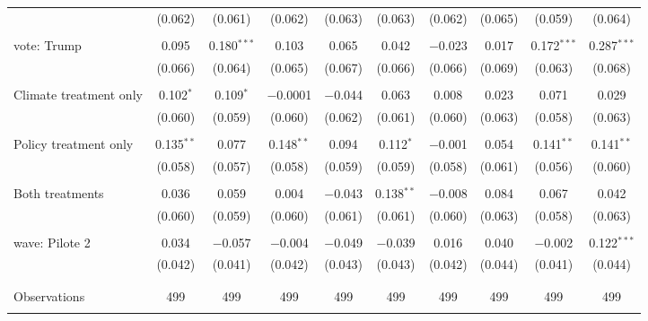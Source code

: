\begin{tabular}{@{\extracolsep{5pt}}lccccccccc}
  & (0.062) & (0.061) & (0.062) & (0.063) & (0.063) & (0.062) & (0.065) & (0.059) & (0.064) \\ 
  & & & & & & & & & \\ 
 vote: Trump & 0.095 & 0.180$^{***}$ & 0.103 & 0.065 & 0.042 & $-$0.023 & 0.017 & 0.172$^{***}$ & 0.287$^{***}$ \\ 
  & (0.066) & (0.064) & (0.065) & (0.067) & (0.066) & (0.066) & (0.069) & (0.063) & (0.068) \\ 
  & & & & & & & & & \\ 
 Climate treatment only & 0.102$^{*}$ & 0.109$^{*}$ & $-$0.0001 & $-$0.044 & 0.063 & 0.008 & 0.023 & 0.071 & 0.029 \\ 
  & (0.060) & (0.059) & (0.060) & (0.062) & (0.061) & (0.060) & (0.063) & (0.058) & (0.063) \\ 
  & & & & & & & & & \\ 
 Policy treatment only & 0.135$^{**}$ & 0.077 & 0.148$^{**}$ & 0.094 & 0.112$^{*}$ & $-$0.001 & 0.054 & 0.141$^{**}$ & 0.141$^{**}$ \\ 
  & (0.058) & (0.057) & (0.058) & (0.059) & (0.059) & (0.058) & (0.061) & (0.056) & (0.060) \\ 
  & & & & & & & & & \\ 
 Both treatments & 0.036 & 0.059 & 0.004 & $-$0.043 & 0.138$^{**}$ & $-$0.008 & 0.084 & 0.067 & 0.042 \\ 
  & (0.060) & (0.059) & (0.060) & (0.061) & (0.061) & (0.060) & (0.063) & (0.058) & (0.063) \\ 
  & & & & & & & & & \\ 
 wave: Pilote 2 & 0.034 & $-$0.057 & $-$0.004 & $-$0.049 & $-$0.039 & 0.016 & 0.040 & $-$0.002 & 0.122$^{***}$ \\ 
  & (0.042) & (0.041) & (0.042) & (0.043) & (0.043) & (0.042) & (0.044) & (0.041) & (0.044) \\ 
  & & & & & & & & & \\ 
\hline \\[-1.8ex] 

Observations & 499 & 499 & 499 & 499 & 499 & 499 & 499 & 499 & 499 \\ 
\hline 
\hline \\[-1.8ex] 
\end{tabular} 